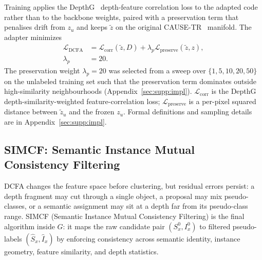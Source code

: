 \documentclass{article}
\newcounter{algorithm}
\begin{document}
Training applies the DepthG~\cite{sick2024depthg} depth-feature correlation loss to the adapted code rather than to the backbone weights, paired with a preservation term that penalises drift from $z_u$ and keeps $\tilde z$ on the original CAUSE-TR~\cite{kim2024cause} manifold. The adapter minimizes
\begin{equation}
\begin{aligned}
\mathcal{L}_\text{DCFA}
&= \mathcal{L}_\text{corr}(\tilde z, D)
 + \lambda_p \mathcal{L}_\text{preserve}(\tilde z, z), \\
\lambda_p &= 20 .
\end{aligned}
\label{eq:dcfa_loss}
\end{equation}
The preservation weight $\lambda_p = 20$ was selected from a sweep over $\{1, 5, 10, 20, 50\}$ on the unlabeled training set such that the preservation term dominates outside high-similarity neighbourhoods (Appendix~\ref{sec:supp:impl}).
$\mathcal{L}_\text{corr}$ is the DepthG~\cite{sick2024depthg} depth-similarity-weighted feature-correlation loss; $\mathcal{L}_\text{preserve}$ is a per-pixel squared distance between $\tilde z_u$ and the frozen $z_u$. Formal definitions and sampling details are in Appendix~\ref{sec:supp:impl}.
\subsection{SIMCF: Semantic Instance Mutual Consistency Filtering}
\label{sec:method:simcf}

DCFA changes the feature space before clustering, but residual errors persist: a depth fragment may cut through a single object, a proposal may mix pseudo-classes, or a semantic assignment may sit at a depth far from its pseudo-class range. SIMCF (Semantic Instance Mutual Consistency Filtering) is the final algorithm inside $G$: it maps the raw candidate pair $(S_x^0, I_x^0)$ to filtered pseudo-labels $(\hat S_x, \hat I_x)$ by enforcing consistency across semantic identity, instance geometry, feature similarity, and depth statistics.
\end{document}
